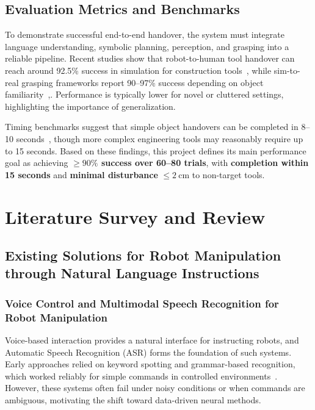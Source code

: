 \documentclass[12pt]{extarticle}
\begin{document}
\begin{enumerate}
\subsection*{Evaluation Metrics and Benchmarks}

To demonstrate successful end-to-end handover, the system must integrate language understanding, symbolic planning, perception, and grasping into a reliable pipeline. Recent studies show that robot-to-human tool handover can reach around 92.5\% success in simulation for construction tools~\cite{iaarc2025_handover}, while sim-to-real grasping frameworks report 90--97\% success depending on object familiarity~\cite{mogpe2022},\cite{grasping2023}. Performance is typically lower for novel or cluttered settings, highlighting the importance of generalization.  

Timing benchmarks suggest that simple object handovers can be completed in 8--10 seconds~\cite{handover2024_fast}, though more complex engineering tools may reasonably require up to 15 seconds. Based on these findings, this project defines its main performance goal as achieving \textbf{$\geq90\%$ success over 60–80 trials}, with \textbf{completion within 15 seconds} and \textbf{minimal disturbance} $\leq\SI{2}{\centi\meter}$ to non-target tools.


\end{enumerate}

\newpage
\section{Literature Survey and Review}

\subsection{Existing Solutions for Robot Manipulation through Natural Language Instructions}

\subsubsection{Voice Control and Multimodal Speech Recognition for Robot Manipulation}

Voice-based interaction provides a natural interface for instructing robots, and Automatic Speech Recognition (ASR) forms the foundation of such systems. Early approaches relied on keyword spotting and grammar-based recognition, which worked reliably for simple commands in controlled environments~\cite{smith2015voice}. However, these systems often fail under noisy conditions or when commands are ambiguous, motivating the shift toward data-driven neural methods.
\end{document}
